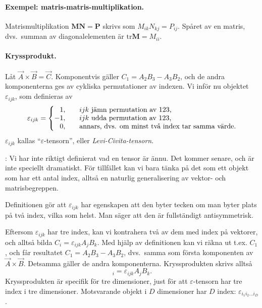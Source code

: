 \documentclass[%
oneside,                 %
final,                   %
10pt]{article}
\newcommand{\longinlinecomment}[3]{{\color{red}{\bf #1}: #2}}
\begin{document}
\paragraph{Exempel: matris-matris-multiplikation.}
Matrismultiplikation $\mathbf{M}\mathbf{N}=\mathbf{P}$ skrivs som $M_{ik}N_{kj}=P_{ij}$. Spåret av en matris, dvs.~summan av diagonalelementen är $\mathrm{tr}\mathbf{M}=M_{ii}$.

\paragraph{Kryssprodukt.}
Låt $\vec{A}\times\vec{B}=\vec{C}$. Komponentvis gäller $C_1=A_2B_3-A_3B_2$, och de andra komponenterna ges av cykliska permutationer av indexen. Vi inför nu objektet $\varepsilon_{ijk}$, som definieras av
\begin{equation}
\varepsilon_{ijk}=\left\{
\begin{matrix}
\phantom{-}1,\quad\hfill&ijk\hbox{ jämn permutation av 123,}\hfill\cr
-1,\quad\hfill&ijk\hbox{ udda permutation av 123,}\hfill\cr
\phantom{-}0,\hfill&\hbox{annars, dvs. om minst två index tar samma
värde.}
\end{matrix}
\right.
\end{equation}
$\varepsilon_{ijk}$ kallas ``$\varepsilon$-tensorn'', eller \emph{Levi-Civita-tensorn}. 

\longinlinecomment{Comment 2}{ Vi har inte riktigt definierat vad en tensor är ännu. Det kommer senare, och är inte speciellt dramatiskt. För tillfället kan vi bara tänka på det som ett objekt som har ett antal index, alltså en naturlig generalisering av vektor- och matrisbegreppen. }{ Vi har inte riktigt }

Definitionen gör att $\varepsilon_{ijk}$ har egenskapen att den byter tecken om man byter plats på två index, vilka som helst. Man säger att den är fullständigt antisymmetrisk.

Eftersom $\varepsilon_{ijk}$ har tre index, kan vi kontrahera två av dem med index på vektorer, och alltså bilda $C_i=\varepsilon_{ijk}A_jB_k$. Med hjälp av definitionen kan vi räkna ut t.ex. $C_1$, och får resultatet $C_1=A_2B_3-A_3B_2$, dvs.~samma som första komponenten av $\vec{A}\times\vec{B}$. Detsamma gäller de andra komponenterna. Kryssprodukten skrivs alltså
\begin{equation}
[\vec{A}\times\vec{B}]_i=\varepsilon_{ijk}A_jB_k .
\end{equation}
Kryssprodukten är specifik för tre dimensioner, just för att $\varepsilon$-tensorn har tre index i tre dimensioner. Motsvarande objekt i $D$ dimensioner har $D$ index: $\varepsilon_{i_1i_2\ldots i_D}$.
\end{document}
